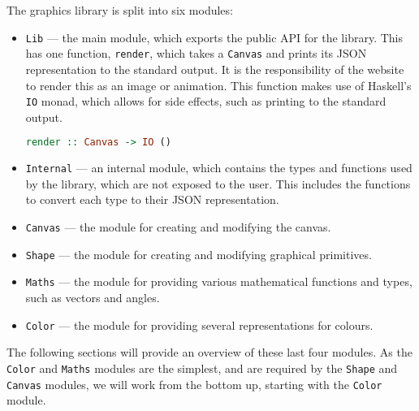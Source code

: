 \documentclass[../main.tex]{subfiles}
\begin{document}
            The graphics library is split into six modules:
            \begin{itemize}
                \item \texttt{Lib} — the main module, which exports the public API for the library.
                      This has one function, \texttt{render}, which takes a \texttt{Canvas} and
                          prints its JSON representation to the standard output.
                      It is the responsibility of the website to render this as an image or
                          animation.
                      This function makes use of Haskell's \texttt{IO} monad, which allows for side
                          effects, such as printing to the standard output.

                      \begin{lstlisting}[language={Haskell}, label={lst:lib}, caption={The 
                        \texttt{render} function.
                        The \texttt{IO ()} return type means that the function has side effects, 
                        specifically printing to the standard output, but no value is returned.}]
render :: Canvas -> IO ()\end{lstlisting}

                \item \texttt{Internal} — an internal module, which contains the types and
                      functions used by the library, which are not exposed to the user.
                      This includes the functions to convert each type to their JSON representation.

                \item \texttt{Canvas} — the module for creating and modifying the canvas.

                \item \texttt{Shape} — the module for creating and modifying graphical primitives.

                \item \texttt{Maths} — the module for providing various mathematical functions and
                      types, such as vectors and angles.

                \item \texttt{Color} — the module for providing several representations for colours.
            \end{itemize}

            The following sections will provide an overview of these last four modules.
            As the \texttt{Color} and \texttt{Maths} modules are the simplest, and are
                required by the \texttt{Shape} and \texttt{Canvas} modules, we will work from
                the bottom up, starting with the \texttt{Color} module.
\end{document}
